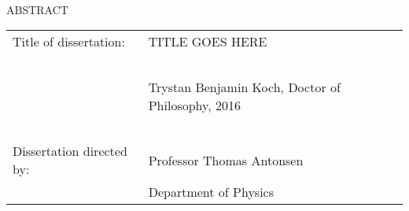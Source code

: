 
\hbox{\ }

\renewcommand{\baselinestretch}{1}
\small \normalsize

\begin{center}
\large{{ABSTRACT}} 

\vspace{3em} 

\end{center}
\hspace{-.15in}
\begin{tabular}{ll}
Title of dissertation:    & {\large  TITLE GOES HERE }\\
\ \\
&                          {\large  Trystan Benjamin Koch, Doctor of Philosophy, 2016} \\
\ \\
Dissertation directed by: & {\large  Professor Thomas Antonsen} \\
&  		            {\large  Department of Physics } \\
\end{tabular}

\vspace{3em}

\renewcommand{\baselinestretch}{2}
\large \normalsize




